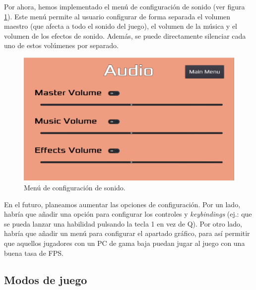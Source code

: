 Por ahora, hemos implementado el menú de configuración de sonido (ver figura \ref{fig:AudioMenu}). Este menú permite al usuario configurar de forma separada el volumen maestro (que afecta a todo el sonido del juego), el volumen de la música y el volumen de los efectos de sonido. Además, se puede directamente silenciar cada uno de estos volúmenes por separado.

\begin{figure}
	\centering
	\includegraphics[width=0.8\linewidth]{figures/AudioMenu}
	\caption{Menú de configuración de sonido.}
	\label{fig:AudioMenu}
\end{figure}

\vspace{\baselineskip}

En el futuro, planeamos aumentar las opciones de configuración. Por un lado, habría que añadir una opción para configurar los controles y \emph{keybindings} (ej.: que se pueda lanzar una habilidad pulsando la tecla 1 en vez de Q). Por otro lado, habría que añadir un menú para configurar el apartado gráfico, para así permitir que aquellos jugadores con un PC de gama baja puedan jugar al juego con una buena tasa de FPS.


\subsection{Modos de juego}

